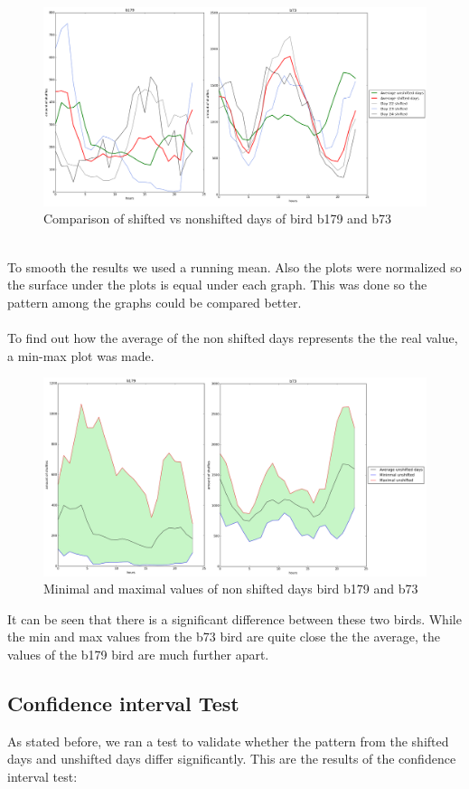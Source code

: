 \documentclass[a4paper]{article}
\begin{document}
\begin{figure}[H]
  \centering
    \includegraphics[width=1\textwidth]{b179_b73_merged}
      \caption{Comparison of shifted vs nonshifted days of bird b179 and b73}
\end{figure}
\\
To smooth the results we used a running mean. Also the plots were normalized so the surface under the plots is equal under each graph. This was done so the pattern among the graphs could be compared better.
\\ \\
To find out how the average of the non shifted days represents the the real value, a min-max plot was made.
\begin{figure}[H]
  \centering
    \includegraphics[width=1\textwidth]{b179_b73_merged_surface}
      \caption{Minimal and maximal values of non shifted days bird b179 and b73}
\end{figure}
It can be seen that there is a significant difference between these two birds. While the min and max values from the b73 bird are quite close the the average, the values of the b179 bird are much further apart.
\subsection*{Confidence interval Test}
As stated before, we ran a test to validate whether the pattern from the shifted days and unshifted days differ significantly. This are the results of the confidence interval test:\\
\end{document}
